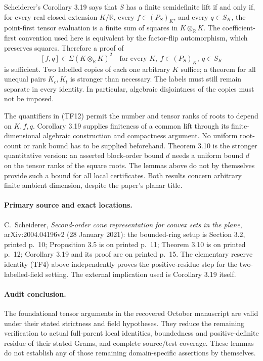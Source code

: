 Scheiderer's Corollary 3.19 says that $S$ has a finite semidefinite
lift if and only if, for every real closed extension $K/\mathbb R$,
every $f\in(P_S)_K$, and every $q\in S_K$, the point-first tensor
evaluation is a finite sum of squares in $K\otimes_{\mathbb R}K$.
The coefficient-first convention used here is equivalent by the
factor-flip automorphism, which preserves squares.
Therefore a proof of
\[
       [f,q]\in\Sigma(K\otimes_{\mathbb R}K)^2
       \quad\text{for every }K,\ f\in(P_S)_K,\ q\in S_K
 \tag{TF12}
\]
is sufficient. Two labelled copies of each one arbitrary $K$ suffice;
a theorem for all unequal pairs $K_c,K_t$ is stronger than necessary.
The labels must still remain separate in every identity. In particular,
algebraic disjointness of the copies must not be imposed.

The quantifiers in (TF12) permit the number and tensor ranks of roots
to depend on $K,f,q$. Corollary 3.19 supplies finiteness of a common
lift through its finite-dimensional algebraic construction and
compactness argument. No uniform root-count or rank bound has to be
supplied beforehand. Theorem 3.10 is the stronger quantitative version:
an asserted block-order bound $d$ needs a uniform bound $d$ on the
tensor ranks of the square roots. The lemmas above do not by themselves
provide such a bound for all local certificates. Both results concern
arbitrary finite ambient dimension, despite the paper's planar title.

\paragraph{Primary source and exact locations.}
C.~Scheiderer, \emph{Second-order cone representation for convex sets
in the plane}, arXiv:2004.04196v2 (28 January 2021): the bounded-ring
setup is Section 3.2, printed p.~10; Proposition 3.5 is on printed
p.~11; Theorem 3.10 is on printed p.~12; Corollary 3.19 and its proof
are on printed p.~15. The elementary reserve identity (TF4) above
independently proves the positive-residue step for the two-labelled-field
setting. The external implication used is Corollary 3.19 itself.

\paragraph{Audit conclusion.}
The foundational tensor arguments in the recovered October manuscript
are valid under their stated strictness and field hypotheses. They
reduce the remaining verification to actual full-parent local
identities, boundedness and positive-definite residue of their stated
Grams, and complete source/test coverage. These lemmas do not establish
any of those remaining domain-specific assertions by themselves.

